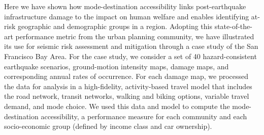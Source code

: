 Here we have shown how mode-destination accessibility links post-earthquake infrastructure damage to the impact on human welfare and enables identifying at-risk geographic and demographic groups in a region. 
Adopting this state-of-the-art performance metric from the urban planning community, we have illustrated its use for seismic risk assessment and mitigation through a case study of the San Francisco Bay Area. For the case study, we consider a set of 40 hazard-consistent earthquake scenarios, ground-motion intensity maps, damage maps, and corresponding annual rates of occurrence. For each damage map, we processed the data for analysis in a high-fidelity, activity-based travel model that includes the road network, transit networks, walking and biking options, variable travel demand, and mode choice. We used this data and model to compute the mode-destination accessibility, a performance measure for each community and each socio-economic group (defined by income class and car ownership). 


%

